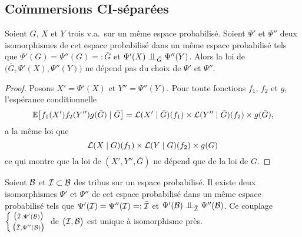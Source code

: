 \documentclass[12pt,a4paper]{article}
\begin{document}
\begin{appendices}
%
%


\section{Co\"immersions CI-séparées}

\begin{lemme}\label{lemme:uniciteCIcopies}
Soient $G$, $X$ et $Y$ trois v.a.\ sur un même espace probabilisé.  
Soient $\Psi'$ et $\Psi''$  deux isomorphismes de 
cet espace probabilisé dans un même espace probabilisé 
tels que $\Psi'(G) = \Psi''(G) =: \bar G$ et 
$\Psi'(X) \indep_{\bar G} \Psi''(Y)$.  
Alors la loi de $\bigl(\bar G, \Psi'(X), \Psi''(Y)\bigr)$ 
ne dépend pas du choix de $\Psi'$ et $\Psi''$. 
\end{lemme}

\begin{proof}
Posons $X'=\Psi'(X)$ et $Y''=\Psi''(Y)$. 
Pour toute fonctions $f_1$, $f_2$ et $g$, 
l'espérance conditionnelle 
$$
\mathbb{E}\bigl[f_1(X')f_2(Y'')g(\bar G) \mid \bar G \bigr] 
= \mathcal{L}(X'\mid\bar G)(f_1) \times \mathcal{L}(Y''\mid\bar G)(f_2) \times g(\bar G),
$$
a la même loi que 
$$
\mathcal{L}(X\mid G)(f_1) \times \mathcal{L}(Y\mid G)(f_2) \times g(G)
$$
ce qui montre que la loi de $(X',Y'',\bar G)$ ne dépend que de la loi de $G$. 
\end{proof}

\begin{lemme}\label{lemme:CIcopies}
Soient $\mathcal{B}$ et $\mathcal{I} \subset \mathcal{B}$ des tribus sur un espace probabilisé. 
Il existe deux isomorphismes $\Psi'$ et $\Psi''$  de 
cet espace probabilisé dans un même espace probabilisé 
tels que $\Psi'(\mathcal{I})=\Psi''(\mathcal{I}) =: \bar{\mathcal{I}}$ et 
 $\Psi'(\BB) \indep_{\bar \II} \Psi''(\BB)$. 
Ce couplage $\left\{\begin{smallmatrix} 
\bigl(\bar {\mathcal{I}}, \Psi'(\mathcal{B})\bigr)
\\ 
\bigl(\bar {\mathcal{I}}, \Psi''(\mathcal{B})\bigr)
\end{smallmatrix}\right.$ 
de $\bigl(\mathcal{I}, \mathcal{B}\bigr)$ est unique à isomorphisme près. 
\end{lemme}


\end{appendices}
\end{document}
